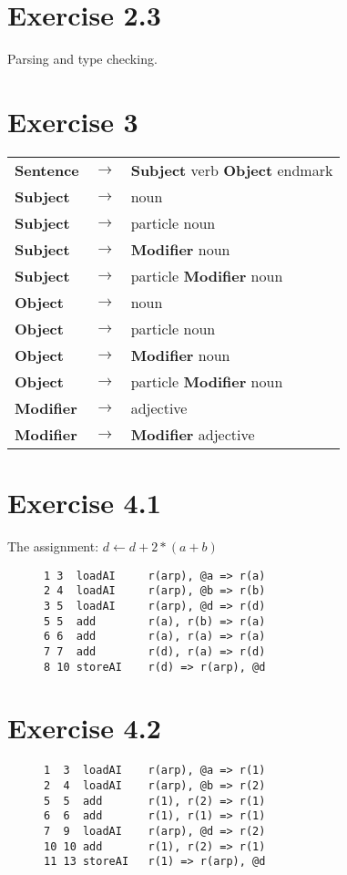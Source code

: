 \documentclass[11pt]{article} %
\begin{document}
\section*{Exercise 2.3}
Parsing and type checking.

\section*{Exercise 3}
\begin{tabular}{lcl}
\textbf{Sentence}		& $\rightarrow$	& \textbf{Subject} verb \textbf{Object} endmark		\\
\textbf{Subject}		& $\rightarrow$	& noun												\\
\textbf{Subject}		& $\rightarrow$	& particle noun										\\
\textbf{Subject}		& $\rightarrow$	& \textbf{Modifier} noun							\\
\textbf{Subject}		& $\rightarrow$	& particle \textbf{Modifier} noun					\\
\textbf{Object}			& $\rightarrow$	& noun												\\
\textbf{Object}			& $\rightarrow$	& particle noun										\\
\textbf{Object}			& $\rightarrow$	& \textbf{Modifier} noun							\\
\textbf{Object}			& $\rightarrow$	& particle \textbf{Modifier} noun					\\
\textbf{Modifier}		& $\rightarrow$	& adjective											\\
\textbf{Modifier}		& $\rightarrow$	& \textbf{Modifier} adjective						\\
\end{tabular}

\section*{Exercise 4.1}
The assignment: $d \leftarrow d + 2 * (a + b)$
\begin{figure}[H]
\begin{verbatim}
1 3  loadAI     r(arp), @a => r(a)
2 4  loadAI     r(arp), @b => r(b)
3 5  loadAI     r(arp), @d => r(d)
5 5  add        r(a), r(b) => r(a)
6 6  add        r(a), r(a) => r(a)
7 7  add        r(d), r(a) => r(d)
8 10 storeAI    r(d) => r(arp), @d 
\end{verbatim}
\end{figure}

\section*{Exercise 4.2}
\begin{figure}[H]
\begin{verbatim}
1  3  loadAI    r(arp), @a => r(1)
2  4  loadAI    r(arp), @b => r(2)
5  5  add       r(1), r(2) => r(1)
6  6  add       r(1), r(1) => r(1)
7  9  loadAI    r(arp), @d => r(2)
10 10 add       r(1), r(2) => r(1)
11 13 storeAI   r(1) => r(arp), @d 
\end{verbatim}
\end{figure}
\end{document}
